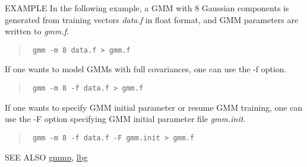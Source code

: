 \begin{options}
\end{options}

\begin{qsection}{EXAMPLE}
In the following example, a GMM with 8 Gaussian components is generated
from training vectors {\em data.f} in float format, and GMM parameters
are written to {\em gmm.f}.
\begin{quote}
\verb! gmm -m 8 data.f > gmm.f!
\end{quote}
If one wants to model GMMs with full covariances,
 one can use the -f option.
\begin{quote}
\verb! gmm -m 8 -f data.f > gmm.f! 
\end{quote}
If one wants to specify GMM initial parameter or resume GMM training,
 one can use the -F option specifying GMM initial parameter file {\em gmm.init}.
\begin{quote}
\verb! gmm -m 8 -f data.f -F gmm.init > gmm.f! 
\end{quote}

\end{qsection}

\begin{qsection}{SEE ALSO}
\hyperlink{gmmp}{gmmp},
\hyperlink{lbg}{lbg}
\end{qsection}
